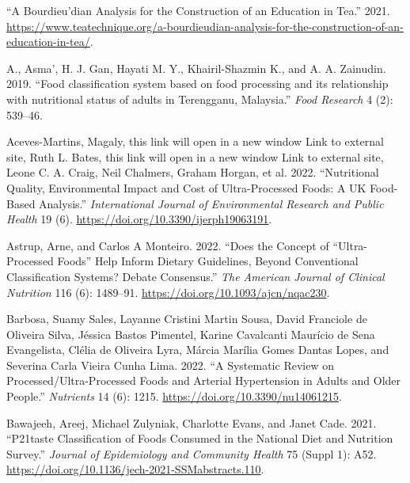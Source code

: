 \documentclass[
]{article}
\newlength{\cslhangindent}
\newlength{\cslentryspacingunit} %
\newenvironment{CSLReferences}[2] %
 {%
  \setlength{\parindent}{0pt}
  \ifodd #1
  \let\oldpar\par
  \def\par{\hangindent=\cslhangindent\oldpar}
  \fi
  \setlength{\parskip}{#2\cslentryspacingunit}
 }%
 {}
\begin{document}
\hypertarget{refs}{}
\begin{CSLReferences}{1}{0}
\leavevmode{}%
{``A Bourdieu{'}dian Analysis for the Construction of an Education in
Tea.''} 2021.
\url{https://www.teatechnique.org/a-bourdieudian-analysis-for-the-construction-of-an-education-in-tea/}.

\leavevmode{}%
A., Asma', H. J. Gan, Hayati M. Y., Khairil-Shazmin K., and A. A.
Zainudin. 2019. {``Food classification system based on food processing
and its relationship with nutritional status of adults in Terengganu,
Malaysia.''} \emph{Food Research} 4 (2): 539--46.

\leavevmode{}%
Aceves-Martins, Magaly, this link will open in a new window Link to
external site, Ruth L. Bates, this link will open in a new window Link
to external site, Leone C. A. Craig, Neil Chalmers, Graham Horgan, et
al. 2022. {``Nutritional Quality, Environmental Impact and Cost of
Ultra-Processed Foods: A UK Food-Based Analysis.''} \emph{International
Journal of Environmental Research and Public Health} 19 (6).
\url{https://doi.org/10.3390/ijerph19063191}.

\leavevmode{}%
Astrup, Arne, and Carlos A Monteiro. 2022. {``Does the Concept of
{``}Ultra-Processed Foods{''} Help Inform Dietary Guidelines, Beyond
Conventional Classification Systems? Debate Consensus.''} \emph{The
American Journal of Clinical Nutrition} 116 (6): 1489--91.
\url{https://doi.org/10.1093/ajcn/nqac230}.

\leavevmode{}%
Barbosa, Suamy Sales, Layanne Cristini Martin Sousa, David Franciole de
Oliveira Silva, Jéssica Bastos Pimentel, Karine Cavalcanti Maurício de
Sena Evangelista, Clélia de Oliveira Lyra, Márcia Marília Gomes Dantas
Lopes, and Severina Carla Vieira Cunha Lima. 2022. {``A Systematic
Review on Processed/Ultra-Processed Foods and Arterial Hypertension in
Adults and Older People.''} \emph{Nutrients} 14 (6): 1215.
\url{https://doi.org/10.3390/nu14061215}.

\leavevmode{}%
Bawajeeh, Areej, Michael Zulyniak, Charlotte Evans, and Janet Cade.
2021. {``P21{\hspace{0.25em}}taste Classification of Foods Consumed in
the National Diet and Nutrition Survey.''} \emph{Journal of Epidemiology
and Community Health} 75 (Suppl 1): A52.
\url{https://doi.org/10.1136/jech-2021-SSMabstracts.110}.


\end{CSLReferences}
\end{document}
